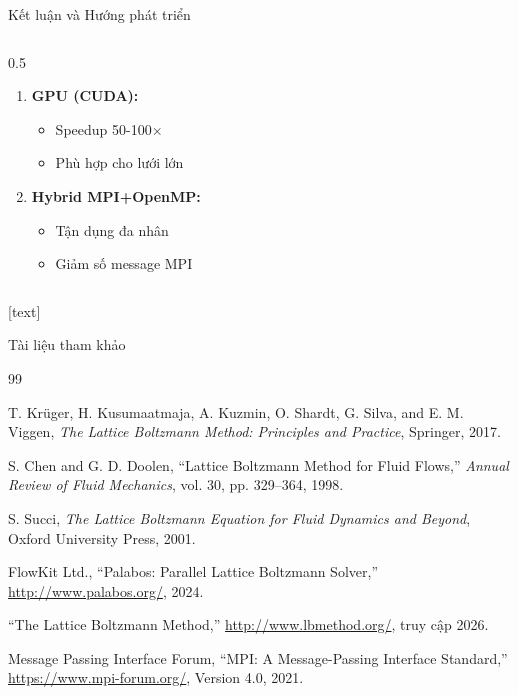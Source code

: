 \documentclass[t, aspectratio=169]{beamer}
\begin{document}
\begin{frame}{Kết luận và Hướng phát triển}
\begin{columns}[T]
\begin{column}{0.5\textwidth}
\begin{enumerate}
					\item \textbf{GPU (CUDA):}
					\begin{itemize}
						\item Speedup 50-100×
						\item Phù hợp cho lưới lớn
					\end{itemize}
					
					\item \textbf{Hybrid MPI+OpenMP:}
					\begin{itemize}
						\item Tận dụng đa nhân
						\item Giảm số message MPI
					\end{itemize}
				\end{enumerate}
			\end{column}
		\end{columns}
	\end{frame}
	
	\useStyleLogoOnly
	
	[text]
	
	\begin{frame}[allowframebreaks]{Tài liệu tham khảo}
		\begin{thebibliography}{99}
			
			T. Krüger, H. Kusumaatmaja, A. Kuzmin, O. Shardt, G. Silva, and E. M. Viggen,
			\emph{The Lattice Boltzmann Method: Principles and Practice},
			Springer, 2017.
			
			S. Chen and G. D. Doolen,
			``Lattice Boltzmann Method for Fluid Flows,''
			\emph{Annual Review of Fluid Mechanics}, vol. 30, pp. 329–364, 1998.
			
			S. Succi,
			\emph{The Lattice Boltzmann Equation for Fluid Dynamics and Beyond},
			Oxford University Press, 2001.
			
			FlowKit Ltd.,
			``Palabos: Parallel Lattice Boltzmann Solver,''
			\url{http://www.palabos.org/}, 2024.
			
			``The Lattice Boltzmann Method,''
			\url{http://www.lbmethod.org/}, truy cập 2026.
			
			Message Passing Interface Forum,
			``MPI: A Message-Passing Interface Standard,''
			\url{https://www.mpi-forum.org/}, Version 4.0, 2021.
			
		\end{thebibliography}
	\end{frame}
	
\end{document}
